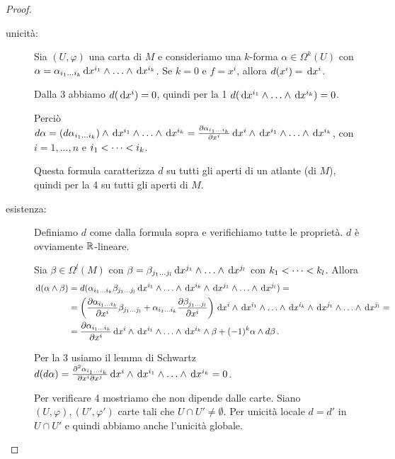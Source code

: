 \begin{proof}
	\begin{description}
		\item [unicità:] Sia $(U,\varphi)$ una carta di $M$ e consideriamo una $k$-forma $\alpha\in\Omega^k(U)$ con $\alpha = \alpha_{\seqb ik{}} \de x^{i_1} \wedge \ldots \wedge \de x^{i_k}$.
		Se $k=0$ e $f=x^i$, allora $d(x^i) = \de x^i$.
		
		Dalla 3 abbiamo $d(\de x^i) = 0$, quindi per la 1 $d(\de x^{i_1} \wedge \ldots \wedge \de x^{i_k}) = 0$.
		
		Perciò $d\alpha = (d \alpha_{\seqb ik{}}) \wedge \de x^{i_1} \wedge \ldots\wedge \de x^{i_k} = \DerParz{\alpha_{\seqb ik{}}} {x^i} \de x^i \wedge \de x^{i_1} \wedge\ldots \wedge \de x^{i_k}$, con $i=1,\ldots,n$ e $\seqb ik<$.
		
		Questa formula caratterizza $d$ su tutti gli aperti di un atlante (di $M$), quindi per la 4 su tutti gli aperti di $M$.
		\item [esistenza:] Definiamo $d$ come dalla formula sopra e verifichiamo tutte le proprietà. $d$ è ovviamente $\R$-lineare.
		
		Sia $\beta\in\Omega^l(M)$ con $\beta= \beta_{\seqb jl{}} \de x^{j_1} \wedge\ldots\wedge \de x^{j_l}$ con $\seqb kl<$. Allora
		\begin{align*}
			\de (\alpha \wedge \beta) &= d (\alpha_{\seqb ik{}} \beta_{\seqb jl{}} \de x^{i_1} \wedge\ldots\wedge \de x^{i_k}\wedge \de x^{j_1} \wedge\ldots\wedge \de x^{j_l}) =\\
			&= \left(\DerParz{\alpha_{\seqb ik{}}}{x^i} \beta_{\seqb jl{}} + \alpha_{\seqb ik{}} \DerParz{\beta_{\seqb jl{}}}{x^i} \right) \de x^i\wedge\de x^{i_1} \wedge\ldots\wedge \de x^{i_k}\wedge \de x^{j_1} \wedge\ldots\wedge \de x^{j_l} = \\
			&=\DerParz{\alpha_{\seqb ik{}}}{x^i} \de x^i\wedge\de x^{i_1} \wedge\ldots\wedge \de x^{i_k} \wedge \beta + (-1)^k \alpha \wedge d \beta \punto
		\end{align*}
		
		Per la 3 usiamo il lemma di Schwartz $d(d\alpha) = \frac{\partial^2 \alpha_{\seqb ik{}}}{\partial x^i \partial x^j} \de x^i\wedge\de x^{i_1} \wedge\ldots\wedge \de x^{i_k} =0$.
		
		Per verificare 4 mostriamo che non dipende dalle carte. Siano $(U,\varphi), (U',\varphi')$ carte tali che $U\cap U' \not=\emptyset$. Per unicità locale $d = d'$ in $U\cap U'$ e quindi abbiamo anche l'unicità globale.
	\end{description}
\end{proof}


